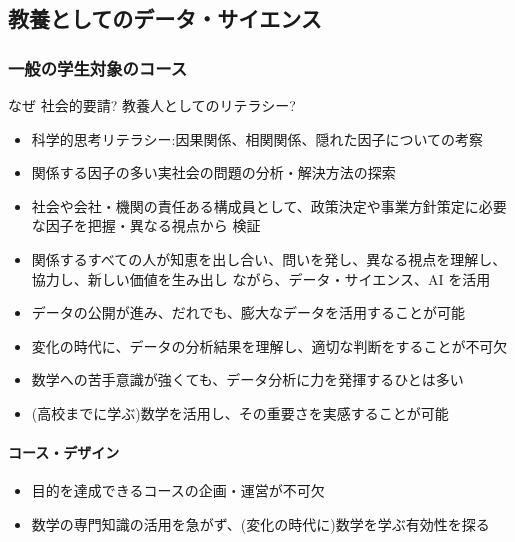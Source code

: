 \documentclass[
]{book}
\providecommand{\tightlist}{%
  \setlength{\itemsep}{0pt}\setlength{\parskip}{0pt}}
\theoremstyle{definition}
\theoremstyle{definition}
\theoremstyle{definition}
\theoremstyle{definition}
\theoremstyle{remark}
\begin{document}
\hypertarget{ux6559ux990aux3068ux3057ux3066ux306eux30c7ux30fcux30bfux30b5ux30a4ux30a8ux30f3ux30b9}{%
\subsection{教養としてのデータ・サイエンス}\label{ux6559ux990aux3068ux3057ux3066ux306eux30c7ux30fcux30bfux30b5ux30a4ux30a8ux30f3ux30b9}}

\hypertarget{ux4e00ux822cux306eux5b66ux751fux5bfeux8c61ux306eux30b3ux30fcux30b9}{%
\subsubsection{一般の学生対象のコース}\label{ux4e00ux822cux306eux5b66ux751fux5bfeux8c61ux306eux30b3ux30fcux30b9}}

なぜ 社会的要請? 教養人としてのリテラシー?

\begin{itemize}
\tightlist
\item
  科学的思考リテラシー:因果関係、相関関係、隠れた因子についての考察
\item
  関係する因子の多い実社会の問題の分析・解決方法の探索
\item
  社会や会社・機関の責任ある構成員として、政策決定や事業方針策定に必要な因子を把握・異なる視点から 検証
\item
  関係するすべての人が知恵を出し合い、問いを発し、異なる視点を理解し、協力し、新しい価値を生み出し ながら、データ・サイエンス、AI を活用
\item
  データの公開が進み、だれでも、膨大なデータを活用することが可能
\item
  変化の時代に、データの分析結果を理解し、適切な判断をすることが不可欠
\item
  数学への苦手意識が強くても、データ分析に力を発揮するひとは多い
\item
  (高校までに学ぶ)数学を活用し、その重要さを実感することが可能
\end{itemize}

\hypertarget{ux30b3ux30fcux30b9ux30c7ux30b6ux30a4ux30f3}{%
\paragraph{コース・デザイン}\label{ux30b3ux30fcux30b9ux30c7ux30b6ux30a4ux30f3}}

\begin{itemize}
\tightlist
\item
  目的を達成できるコースの企画・運営が不可欠
\item
  数学の専門知識の活用を急がず、(変化の時代に)数学を学ぶ有効性を探る
\end{itemize}
\end{document}
